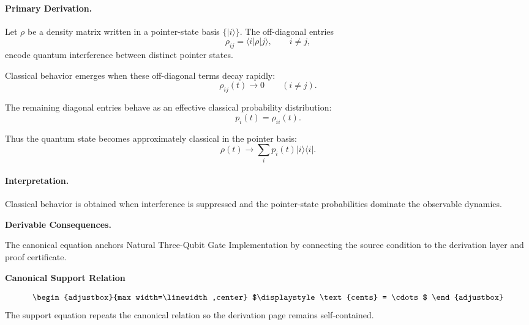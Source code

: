 \paragraph{Primary Derivation.}
Let $\rho$ be a density matrix written in a pointer-state basis $\{|i\rangle\}$.  
The off-diagonal entries
\begin{equation}
\rho_{ij}
=
\langle i|\rho|j\rangle,
\qquad i\neq j,
\end{equation}
encode quantum interference between distinct pointer states.

Classical behavior emerges when these off-diagonal terms decay rapidly:
\begin{equation}
\rho_{ij}(t)\rightarrow 0
\qquad
(i\neq j).
\end{equation}

The remaining diagonal entries behave as an effective classical probability distribution:
\begin{equation}
p_i(t)=\rho_{ii}(t).
\end{equation}

Thus the quantum state becomes approximately classical in the pointer basis:
\begin{equation}
\boxed{
\rho(t)
\longrightarrow
\sum_i p_i(t)|i\rangle\langle i|.
}
\end{equation}

\paragraph{Interpretation.}
Classical behavior is obtained when interference is suppressed and the pointer-state probabilities dominate the observable dynamics.

\par\vspace{0.35em}
\noindent\textbf{Derivable Consequences.}\quad
\begingroup
\footnotesize
\raggedright
The canonical equation anchors Natural Three-Qubit Gate Implementation by connecting the source condition to the derivation layer and proof certificate.
\par\endgroup

\noindent\textbf{Canonical Support Relation}\par
\[
\begin{adjustbox}{max width=\linewidth,center}
$\displaystyle
\text{cents} = \cdots
$
\end{adjustbox}
\]
\noindent The support equation repeats the canonical relation so the derivation page remains self-contained.\par

